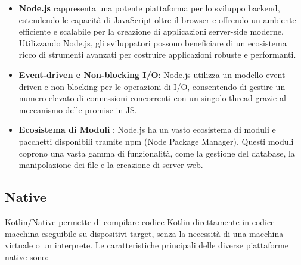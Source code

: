 \documentclass[12pt,a4paper,openright,twoside]{book}
\begin{document}
\begin{itemize}
\item \textbf{Node.js} rappresenta una potente piattaforma per lo sviluppo backend, estendendo le capacità di JavaScript oltre il browser e offrendo un ambiente efficiente e scalabile 
per la creazione di applicazioni server-side moderne. Utilizzando Node.js, gli sviluppatori possono beneficiare di un ecosistema ricco di strumenti avanzati per costruire
applicazioni robuste e performanti.
\item \textbf{Event-driven e Non-blocking I/O}: Node.js utilizza un modello event-driven e non-blocking per le operazioni di I/O, consentendo di gestire un numero elevato di connessioni
 concorrenti con un singolo thread grazie al meccanismo delle promise in \ac{JS}.
\item \textbf{Ecosistema di Moduli }: Node.js ha un vasto ecosistema di moduli e pacchetti disponibili tramite npm (Node Package Manager). 
Questi moduli coprono una vasta gamma di funzionalità, come la gestione del database, la manipolazione dei file e la creazione di server web. 
\end{itemize}

\subsection{Native}

Kotlin/Native permette di compilare codice Kotlin direttamente in codice macchina eseguibile su dispositivi target, senza la necessità di una macchina virtuale o un interprete.
Le caratteristiche principali delle diverse piattaforme native sono:
\end{document}

